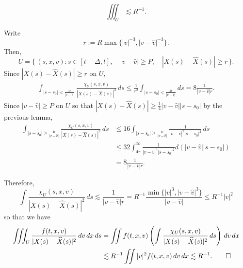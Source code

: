\documentclass[12pt]{article}
\begin{document}
\begin{prop}
\[\iiint_U\lesssim R^{-1}.\]
\end{prop}
\begin{pf}
Write
\[r:=R\max\{|v|^{-3},|v-\hat v|^{-3}\}.\]
Then,
\[U=\{\,(s,x,v):s\in[t-\Delta,t],\quad|v-\hat v|\ge P,\quad |X(s)-\hat X(s)|\ge r\,\}.\]
Since $|X(s)-\hat X(s)|\ge r$ on $U$,
\begin{align*}
\int_{|s-s_0|<\frac{4r}{|v-\hat v|}}\frac{\chi_U(s,x,v)}{|X(s)-\hat X(s)|^2}\,ds
\le\frac1{r^2}\int_{|s-s_0|<\frac{4r}{|v-\hat v|}}ds=8\frac1{|v-\hat v|r}.
\end{align*}
Since $|v-\hat v|\ge P$ on $U$ so that $|X(s)-\hat X(s)|\ge\frac14|v-\hat v||s-s_0|$ by the previous lemma,
\begin{align*}
\int_{|s-s_0|\ge\frac{4r}{|v-\hat v|}}\frac{\chi_U(s,x,v)}{|X(s)-\hat X(s)|^2}\,ds
&\le16\int_{|s-s_0|\ge\frac{4r}{|v-\hat v|}}\frac1{|v-\hat v|^2|s-s_0|^2}\,ds\\
&\le32\int_{4r}^\infty\frac1{|v-\hat v|^3|s-s_0|^2}d(|v-\hat v||s-s_0|)\\
&=8\frac1{|v-\hat v|r}.
\end{align*}

Therefore,
\[\int\frac{\chi_U(s,x,v)}{|X(s)-\hat X(s)|^2}\,ds\lesssim\frac1{|v-\hat v|r}=R^{-1}\frac{\min\{|v|^3,|v-\hat v|^3\}}{|v-\hat v|}\le R^{-1}|v|^2\]
so that we have
\begin{align*}
\iiint_U\frac{f(t,x,v)}{|X(s)-\hat X(s)|^2}\,dv\,dx\,ds
&=\iint f(t,x,v)\left(\int\frac{\chi_U(s,x,v)}{|X(s)-\hat X(s)|^2}\,ds\right)\,dv\,dx\\
&\lesssim R^{-1}\iint|v|^2f(t,x,v)\,dv\,dx\lesssim R^{-1}.\qedhere
\end{align*}
\end{pf}
\end{document}

